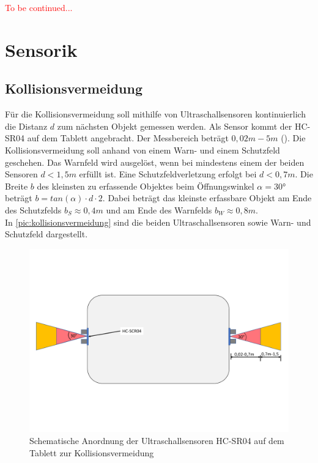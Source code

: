 \textcolor{red}{To be continued...}

\section{Sensorik}
\subsection{Kollisionsvermeidung}
Für die Kollisionsvermeidung soll mithilfe von Ultraschallsensoren kontinuierlich die Distanz $d$ zum nächsten Objekt gemessen werden. Als Sensor kommt der HC-SR04 auf dem Tablett angebracht. Der Messbereich beträgt $0,02m - 5m$ (\cite{hcrs04}). Die Kollisionsvermeidung soll anhand von einem Warn- und einem Schutzfeld geschehen. Das Warnfeld wird ausgelöst, wenn bei mindestens einem der beiden Sensoren $d<1,5m$ erfüllt ist. Eine Schutzfeldverletzung erfolgt bei $d<0,7m$. Die Breite $b$ des kleinsten zu erfassende Objektes beim Öffnungswinkel $\alpha = 30°$ beträgt $b= tan(\alpha) \cdot d \cdot 2$. Dabei beträgt das kleinste erfassbare Objekt am Ende des Schutzfelds $b_S \approx 0,4m$ und am Ende des Warnfelds $b_W \approx 0,8m$. \\
In \autoref{pic:kollisionsvermeidung} sind die beiden Ultraschallsensoren sowie Warn- und Schutzfeld dargestellt. 

\begin{figure}[h]
	\begin{center}
		\includegraphics[width=15cm]{kollisionsvermeidung.pdf}
		\caption{Schematische Anordnung der Ultraschallsensoren HC-SR04 auf dem Tablett zur Kollisionsvermeidung}
		\label{pic:kollisionsvermeidung}
	\end{center}
\end{figure}


